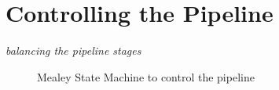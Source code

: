 \documentclass[mscthesis]{usiinfthesis}
\begin{document}
\section{Controlling the Pipeline}
\label{ch:design_ctrl}

\emph{\color{red}balancing the pipeline stages}

\begin{figure}
    \centering
    
    \caption{Mealey State Machine to control the pipeline}
    \label{fig:arch_sm}
\end{figure}


\end{document}
